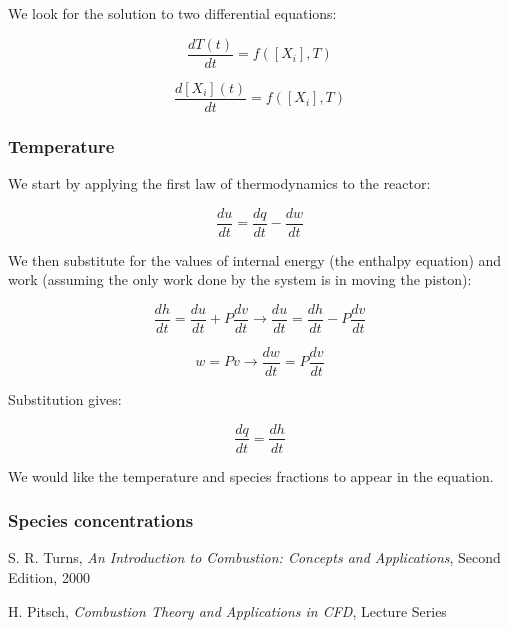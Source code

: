 \documentclass[10pt,twocolumn]{article}
\begin{document}
We look for the solution to two differential equations:

\begin{equation}
\frac{d T(t)}{dt} = f([X_i], T)
\end{equation}

\begin{equation}
\frac{d [X_i](t)}{dt} = f([X_i], T)
\end{equation}

\subsubsection{Temperature}

We start by applying the first law of thermodynamics to the reactor:

\begin{equation}
\frac{du}{dt} = \frac{dq}{dt} - \frac{dw}{dt}
\end{equation}

We then substitute for the values of internal energy (the enthalpy equation) and work (assuming the only work done by the system is in moving the piston):

\begin{equation}
\frac{dh}{dt} = \frac{du}{dt} + P \frac{dv}{dt} \rightarrow \frac{du}{dt} = \frac{dh}{dt} - P \frac{dv}{dt}
\end{equation}

\begin{equation}
w = Pv \rightarrow \frac{d w}{dt} = P \frac{dv}{dt} 
\end{equation}

Substitution gives:

\begin{equation}
\frac{dq}{dt} = \frac{dh}{dt}
\end{equation}

We would like the temperature and species fractions to appear in the equation.

\subsubsection{Species concentrations}










\thebibliography{}

 S. R. Turns, \textit{An Introduction to Combustion: Concepts and Applications}, Second Edition, 2000 \label{bib:turns}

 H. Pitsch, \textit{Combustion Theory and Applications in CFD}, Lecture Series \label{bib:pitsch}

\label{bib:pope}
\end{document}
